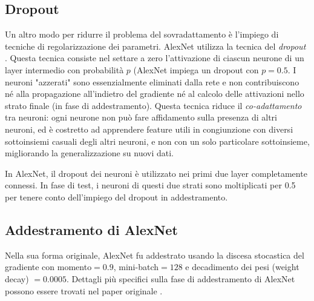 \subsection*{Dropout}
Un altro modo per ridurre il problema del sovradattamento è l'impiego di tecniche di regolarizzazione dei parametri. AlexNet utilizza la tecnica del \textit{dropout} \cite{dropout}. Questa tecnica consiste nel settare a zero l'attivazione di ciascun neurone di un layer intermedio con probabilità $p$ (AlexNet impiega un dropout con $p=0.5$. I neuroni "azzerati" sono essenzialmente eliminati dalla rete e non contribuiscono né alla propagazione all'indietro del gradiente né al calcolo delle attivazioni nello strato finale (in fase di addestramento). Questa tecnica riduce il \textit{co-adattamento} tra neuroni: ogni neurone non può fare affidamento sulla presenza di altri neuroni, ed è costretto ad apprendere feature utili in congiunzione con diversi sottoinsiemi casuali degli altri neuroni, e non con un solo particolare sottoinsieme, migliorando la generalizzazione su nuovi dati.

In AlexNet, il dropout dei neuroni è utilizzato nei primi due layer completamente connessi. In fase di test, i neuroni di questi due strati sono moltiplicati per 0.5 per tenere conto dell'impiego del dropout in addestramento.

\subsection*{Addestramento di AlexNet}
Nella sua forma originale, AlexNet fu addestrato usando la discesa stocastica del gradiente con momento$=0.9$, mini-batch$=128$ e decadimento dei pesi (weight decay) $=0.0005$. Dettagli più specifici sulla fase di addestramento di AlexNet possono essere trovati nel paper originale \cite{alexnet}.

